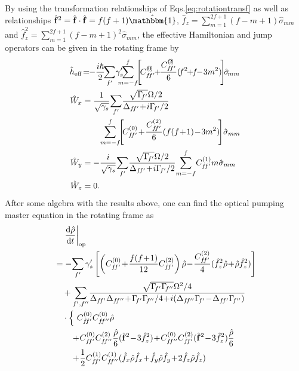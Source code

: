 \documentclass[aps,pra,twocolumn,superscriptaddress]{revtex4-1} %
\newcommand{\dt}[1]{\frac{{\mathrm d} {#1}}{{\mathrm d}t}}
\newcommand{\nn}{\nonumber}
\newcommand{\fo}{\hat{\mathbf{f}}}
\begin{document}
\begin{appendix}
By using the transformation relationships of Eqs.\eqref{eq:rotationtransf} as well as relationships $ \hat{\mathbf{f}}^2=\hat{\mathbf{f}}\cdot\hat{\mathbf{f}}=f(f+1)\hat{\mathbbm{1}} $, $ \hat{f}_z =\sum_{m=1}^{2f+1}(f-m+1)\hat{\sigma}_{mm} $ and $ \hat{f}_z^2 = \sum_{m=1}^{2f+1}(f-m+1)^2\hat{\sigma}_{mm} $, the effective Hamiltonian and jump operators can be given in the rotating frame by
\begin{subequations}
\begin{align}
\hat{h}_{\rm eff} &\!=\!\! -\frac{i\hbar}{2} \!\!\sum_{f'}\! \gamma'_s \!\!\!\!\!\sum_{m=-f}^f\!\!\left[\!C_{f\!f'}^{(\!0\!)} \!\!+\!\! \frac{C_{f\!f'}^{(\!2\!) }}{6}(\!f^2\!\!+\!\!f\!\!-\!3m^2)\! \right]\!\!\hat{\sigma}\!_{mm}\\
\hat{W}_{x} &= \frac{1}{\sqrt{\gamma_s}}\!\sum_{f'}\! \frac{\sqrt{\Gamma\!_{f'} }\Omega/2}{\Delta_{f\!f'}\!+\!i\Gamma\!_{f'}/2 }\nn\\ &\quad\quad\sum_{m=-f}^f\!\!\left[\!C_{f\!f'}^{(0)} \!+\! \frac{C_{f\!f'}^{(2) }}{6}(f(f\!+\!1)\!-\!3m^2)\! \right]\!\hat{\sigma}_{mm}\\
\hat{W}_{y} &= -\frac{i}{\sqrt{\gamma_s}}\!\sum_{f'}\! \frac{\sqrt{\Gamma\!_{f'} }\Omega/2}{\Delta_{f\!f'}\!+\!i\Gamma\!_{f'}/2 } \!\sum_{m=-f}^f\! C_{f\!f'}^{(1)}m\hat{\sigma}_{mm}\\
\hat{W}_z &=0.
\end{align}
\end{subequations}
After some algebra with the results above, one can find the optical pumping master equation in the rotating frame as
\begin{align}
&\quad\left. \dt{\hat{\rho}}\right|_{\rm op} \nn\\
&= - \!\sum_{f'} \gamma'_s \left[\left(C_{f\!f'}^{(0)}\!+\!\frac{f(f\!+\!1)}{12}C_{f\!f'}^{(2)} \right)\hat{\rho}\!-\!\frac{C_{f\!f'}^{(2)}}{4}(\hat{f}_z^2\hat{\rho} \!+\!\hat{\rho}\hat{f}_z^2) \right]\nn\\
&\quad+\sum_{f',f''}\! \frac{\sqrt{\Gamma\!_{f'}\Gamma\!_{f''} }\Omega^2/4 }{\Delta_{f\!f'}\Delta_{f\!f''}\!+\!\Gamma\!_{f'}\Gamma\!_{f''}/4\!+\!i(\Delta_{f\!f''}\Gamma\!_{f'}\!-\!\Delta_{f\!f'}\Gamma\!_{f''} ) }\nn\\
&\quad\cdot\left\{\,\, C_{f\!f'}^{(0)}C_{f\!f''}^{(0)}\hat{\rho}  \right.\nn\\
&\quad\quad +\! C_{f\!f'}^{(0)}C_{f\!f''}^{(2)}\frac{\hat{\rho}}{6}(\fo^2\!-\!3\hat{f}_z^2) \!+\! C_{f\!f''}^{(0)}C_{f\!f'}^{(2)}(\fo^2\!-\!3\hat{f}_z^2)\frac{\hat{\rho}}{6}\nn\\
&\quad\quad +\! \frac{1}{2}C_{f\!f'}^{(1)}C_{f\!f''}^{(1)}(\hat{f}_x\hat{\rho}\hat{f}_x\!+\!\hat{f}_y\hat{\rho}\hat{f}_y\!+\!2\hat{f}_z\hat{\rho}\hat{f}_z )\nn\\

\end{align}
\end{appendix}
\end{document}
